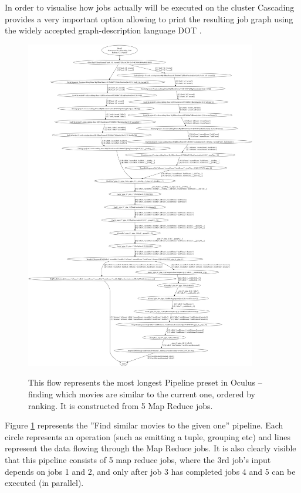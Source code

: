 In order to visualise how jobs actually will be executed on the cluster Cascading provides a very important option allowing to print the resulting job
graph using the widely accepted graph-description language DOT \cite{dot}.

\begin{figure}[ch!]
  \centering
  \includegraphics[width=0.9\textwidth]{img/FindSimilarMoviesJob_dot.png}
  \label{fig:find-similar-movies-most-complicated}
  \caption{This flow represents the most longest Pipeline preset in Oculus -- finding which movies are similar to the current one, ordered by ranking. It is constructed from 5 Map Reduce jobs.}
\end{figure}

Figure \ref{fig:find-similar-movies-most-complicated} represents the ''Find similar movies to the given one'' pipeline. Each circle represents an operation (such as emitting a tuple, grouping etc) and lines represent the data flowing through the Map Reduce jobs. It is also clearly visible that this pipeline consists of 5 map reduce jobs, where the 3rd job's input depends on jobs 1 and 2, and only after job 3 has completed jobs 4 and 5 can be executed (in parallel).

